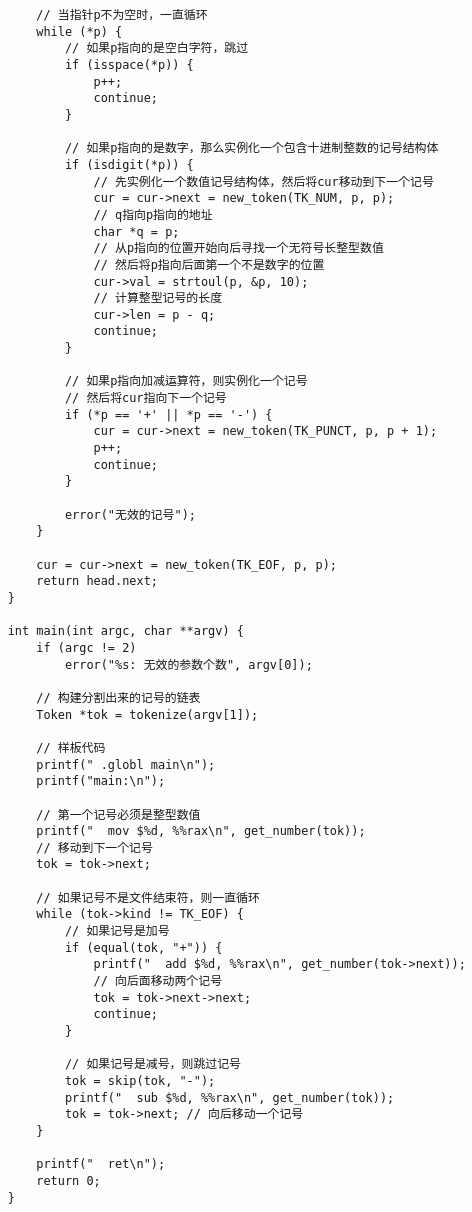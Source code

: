 \documentclass[cn,10pt,math=newtx,citestyle=gb7714-2015,bibstyle=gb7714-2015]{elegantbook}
\begin{document}
\begin{verbatim}
        // 当指针p不为空时，一直循环
        while (*p) {
            // 如果p指向的是空白字符，跳过
            if (isspace(*p)) {
                p++;
                continue;
            }

            // 如果p指向的是数字，那么实例化一个包含十进制整数的记号结构体
            if (isdigit(*p)) {
                // 先实例化一个数值记号结构体，然后将cur移动到下一个记号
                cur = cur->next = new_token(TK_NUM, p, p);
                // q指向p指向的地址
                char *q = p;
                // 从p指向的位置开始向后寻找一个无符号长整型数值
                // 然后将p指向后面第一个不是数字的位置
                cur->val = strtoul(p, &p, 10);
                // 计算整型记号的长度
                cur->len = p - q;
                continue;
            }

            // 如果p指向加减运算符，则实例化一个记号
            // 然后将cur指向下一个记号
            if (*p == '+' || *p == '-') {
                cur = cur->next = new_token(TK_PUNCT, p, p + 1);
                p++;
                continue;
            }

            error("无效的记号");
        }

        cur = cur->next = new_token(TK_EOF, p, p);
        return head.next;
    }

    int main(int argc, char **argv) {
        if (argc != 2)
            error("%s: 无效的参数个数", argv[0]);

        // 构建分割出来的记号的链表
        Token *tok = tokenize(argv[1]);

        // 样板代码
        printf(" .globl main\n");
        printf("main:\n");

        // 第一个记号必须是整型数值
        printf("  mov $%d, %%rax\n", get_number(tok));
        // 移动到下一个记号
        tok = tok->next;

        // 如果记号不是文件结束符，则一直循环
        while (tok->kind != TK_EOF) {
            // 如果记号是加号
            if (equal(tok, "+")) {
                printf("  add $%d, %%rax\n", get_number(tok->next));
                // 向后面移动两个记号
                tok = tok->next->next;
                continue;
            }

            // 如果记号是减号，则跳过记号
            tok = skip(tok, "-");
            printf("  sub $%d, %%rax\n", get_number(tok));
            tok = tok->next; // 向后移动一个记号
        }

        printf("  ret\n");
        return 0;
    }
\end{verbatim}
\end{document}
